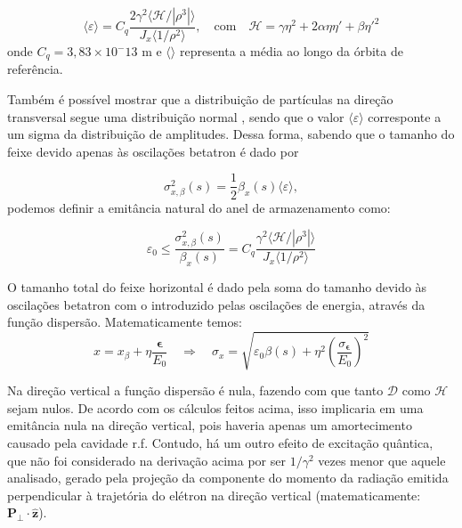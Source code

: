 \begin{equation}
 \langle\varepsilon\rangle = C_q\frac{2 \gamma^2 \langle
\mathcal{H}/|\rho^3|\rangle}{J_x\langle 1/\rho^2 \rangle} ,\quad \text{com}
\quad \mathcal{H}=  \gamma \eta^2 + 2 \alpha \eta \eta' + \beta \eta'^2
\end{equation}
onde $C_q = \mathrm{3,83 \times 10^-13}$ m e $\langle \rangle$ representa a média ao longo da órbita de referência.

Também é possível mostrar que a distribuição de partículas na direção transversal segue uma distribuição normal \cite{Lee}, sendo que o valor $\langle\varepsilon\rangle$ corresponte a um sigma da distribuição de
amplitudes. Dessa forma, sabendo que o tamanho do feixe devido apenas às oscilações betatron é dado por

\begin{equation}
 \sigma_{x,\beta}^2(s) = \frac{1}{2}\beta_x(s)\langle\varepsilon\rangle,
\end{equation}
podemos definir a emitância natural do anel de armazenamento como:

\begin{equation}\label{eqemitancia}
 \varepsilon_0 \leq \frac{\sigma_{x,\beta}^2(s)}{\beta_x(s)} =
C_q\frac{\gamma^2 \langle \mathcal{H}/|\rho^3|\rangle}{J_x\langle 1/\rho^2
\rangle}
\end{equation}

O tamanho total do feixe horizontal é dado pela soma do tamanho devido às oscilações betatron com o introduzido pelas oscilações de energia, através da função dispersão. Matematicamente temos:
\begin{equation}
 x = x_\beta + \eta\frac{\boldsymbol{\epsilon}}{E_0} \quad \Rightarrow \quad
\sigma_x = \sqrt{\varepsilon_0 \beta(s)
+\eta^2 \left(\frac{\sigma_{\boldsymbol{\epsilon}}}{E_0}\right)^2}
\end{equation}

Na direção vertical a função dispersão é nula, fazendo com que tanto $\mathcal{D}$ como $\mathcal{H}$ sejam nulos. De acordo com os cálculos feitos acima, isso implicaria em uma emitância nula na direção vertical, pois haveria apenas um amortecimento causado pela cavidade r.f. Contudo, há um outro efeito de excitação quântica, que não foi considerado na derivação acima por ser $1/\gamma^2$ vezes menor que aquele analisado, gerado pela projeção da componente do momento da radiação emitida perpendicular à trajetória do elétron na direção vertical (matematicamente: $\mathbf{P_\perp} \cdot \mathbf{\hat{z}}$).

